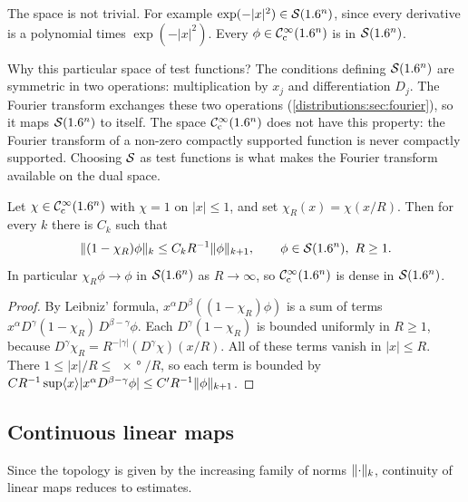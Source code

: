The space is not trivial. For example $\exp(-|x|^2)\in\mathcal{S}(1.6^n)$, since every derivative
is a polynomial times $\exp(-|x|^2)$. Every $\phi\in\mathcal{C}^\infty_{\mathrm{c}}(1.6^n)$ is in $\mathcal{S}(1.6^n)$.

\begin{discussion}
Why this particular space of test functions? The conditions defining $\mathcal{S}(1.6^n)$ are
symmetric in two operations: multiplication by $x_j$ and differentiation $D_j$. The
Fourier transform exchanges these two operations (\cref{distributions:sec:fourier}), so
it maps $\mathcal{S}(1.6^n)$ to itself. The space $\mathcal{C}^\infty_{\mathrm{c}}(1.6^n)$ does not have this property: the
Fourier transform of a non-zero compactly supported function is never compactly
supported. Choosing $\mathcal{S}$ as test functions is what makes the Fourier transform
available on the dual space.
\end{discussion}

\begin{lemma}\label{distributions:lem:cutoff}
Let $\chi\in\mathcal{C}^\infty_{\mathrm{c}}(1.6^n)$ with $\chi=1$ on $|x|\le1$, and set $\chi_R(x)=\chi(x/R)$. Then
for every $k$ there is $C_k$ such that
\[
  \lVert (1-\chi_R)\phi\rVert_k\le C_kR^{-1}\lVert \phi\rVert_{k+1},\qquad\phi\in\mathcal{S}(1.6^n),\ R\ge1.
\]
In particular $\chi_R\phi\to\phi$ in $\mathcal{S}(1.6^n)$ as $R\to\infty$, so $\mathcal{C}^\infty_{\mathrm{c}}(1.6^n)$ is
dense in $\mathcal{S}(1.6^n)$.
\end{lemma}
\begin{proof}
By Leibniz' formula, $x^\alpha D^\beta((1-\chi_R)\phi)$ is a sum of terms
$x^\alpha D^{\gamma}(1-\chi_R)\,D^{\beta-\gamma}\phi$. Each $D^\gamma(1-\chi_R)$ is bounded
uniformly in $R\ge1$, because
$D^\gamma\chi_R=R^{-|\gamma|}(D^\gamma\chi)(x/R)$. All of these terms vanish in
$|x|\le R$. There $1\le|x|/R\le\ang{x}/R$, so each term is bounded by
$CR^{-1}\sup\langle x\rangle|x^\alpha D^{\beta-\gamma}\phi|\le C'R^{-1}\lVert \phi\rVert_{k+1}$.
\end{proof}

\subsection{Continuous linear maps}
Since the topology is given by the increasing family of norms $\lVert \cdot\rVert_k$,
continuity of linear maps reduces to estimates.

